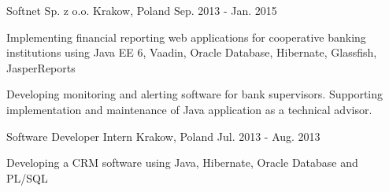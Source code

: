 \begin{cventries}
    {Softnet Sp. z o.o.} %
    {Krakow, Poland} %
    {Sep. 2013 - Jan. 2015} %
    {
      \begin{cvitems} %
       \item {Implementing financial reporting web applications for cooperative banking institutions using Java EE 6, Vaadin, Oracle Database, Hibernate, Glassfish, JasperReports}
	  \item {Developing monitoring and alerting software for bank supervisors. Supporting implementation and maintenance of Java application as a technical advisor.} 
      \end{cvitems}
    }
  \cventry
    {Software Developer Intern} %
    {} %
    {Krakow, Poland} %
    {Jul. 2013 - Aug. 2013} %
    {
      \begin{cvitems} %
       \item {Developing a CRM software using Java, Hibernate, Oracle Database and PL/SQL}
      \end{cvitems}
    }
\end{cventries}
